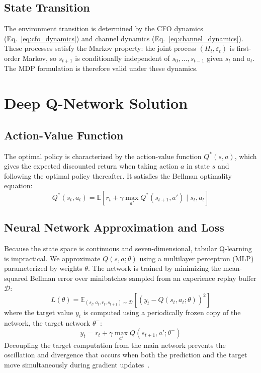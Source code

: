 \subsection{State Transition}

The environment transition is determined by the CFO dynamics (Eq.~\ref{eq:cfo_dynamics}) and channel dynamics (Eq.~\ref{eq:channel_dynamics}). These processes satisfy the Markov property: the joint process $(H_t, \varepsilon_t)$ is first-order Markov, so $s_{t+1}$ is conditionally independent of $s_0, \ldots, s_{t-1}$ given $s_t$ and $a_t$. The MDP formulation is therefore valid under these dynamics.

\section{Deep Q-Network Solution}

\subsection{Action-Value Function}

The optimal policy is characterized by the action-value function $Q^*(s, a)$, which gives the expected discounted return when taking action $a$ in state $s$ and following the optimal policy thereafter. It satisfies the Bellman optimality equation:
\begin{equation}
    Q^*(s_t, a_t) = \mathbb{E}\!\left[r_t + \gamma \max_{a'} Q^*(s_{t+1}, a') \;\Big|\; s_t, a_t\right]
    \label{eq:bellman}
\end{equation}

\subsection{Neural Network Approximation and Loss}

Because the state space is continuous and seven-dimensional, tabular Q-learning is impractical. We approximate $Q(s,a;\theta)$ using a multilayer perceptron (MLP) parameterized by weights $\theta$. The network is trained by minimizing the mean-squared Bellman error over minibatches sampled from an experience replay buffer $\mathcal{D}$:
\begin{equation}
    L(\theta) = \mathbb{E}_{(s_t, a_t, r_t, s_{t+1}) \sim \mathcal{D}}\!\left[\left(y_t - Q(s_t, a_t;\theta)\right)^2\right]
    \label{eq:dqn_loss}
\end{equation}
where the target value $y_t$ is computed using a periodically frozen copy of the network, the target network $\theta^{-}$:
\begin{equation}
    y_t = r_t + \gamma \max_{a'} Q(s_{t+1}, a';\theta^{-})
    \label{eq:dqn_target}
\end{equation}
Decoupling the target computation from the main network prevents the oscillation and divergence that occurs when both the prediction and the target move simultaneously during gradient updates~\cite{mnih2015human}.

